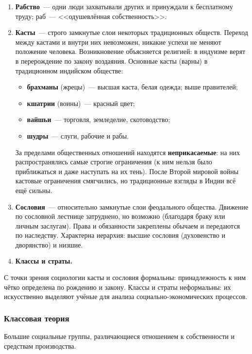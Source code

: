 \documentclass[12pt]{article}
\begin{document}
	\begin{enumerate}
		\item \textbf{Рабство}~--- одни люди захватывали других и принуждали к бесплатному труду; раб~--- <<одушевлённая собственность>>.
		\item \textbf{Касты}~--- строго замкнутые слои некоторых традиционных обществ. Переход между кастами и внутри них невозможен, никакие успехи не меняют положение человека. Возникновение объясняется религией: в индуизме верят в перерождение по закону воздаяния. Основные касты (варны) в традиционном индийском обществе:
		\begin{itemize}
			\item \textbf{брахманы} (жрецы)~--- высшая каста, белая одежда; выше правителей;
			\item \textbf{кшатрии} (воины)~--- красный цвет;
			\item \textbf{вайшьи}~--- торговля, земледелие, скотоводство;
			\item \textbf{шудры}~--- слуги, рабочие и рабы.
		\end{itemize}
		За пределами общественных отношений находятся \textbf{неприкасаемые}: на них распространялись самые строгие ограничения (к ним нельзя было приближаться и даже наступать на их тень). После Второй мировой войны кастовые ограничения смягчились, но традиционные взгляды в Индии всё ещё сильны.
		\item \textbf{Сословия}~--- относительно замкнутые слои феодального общества. Движение по сословной лестнице затруднено, но возможно (благодаря браку или личным заслугам). Права и обязанности закреплены обычаем и передаются по наследству. Характерна иерархия: высшие сословия (духовенство и дворянство) и низшие.
		\item \textbf{Классы и страты.}
	\end{enumerate}

	\begin{note}
		С точки зрения социологии касты и сословия формальны: принадлежность к ним чётко определена по рождению и закону. Классы и страты неформальны: их искусственно выделяют учёные для анализа социально-экономических процессов.
	\end{note}

	\subsubsection{Классовая теория}

	\begin{definition}[Классы]
		Большие социальные группы, различающиеся отношением к собственности и средствам производства.
	\end{definition}
\end{document}
